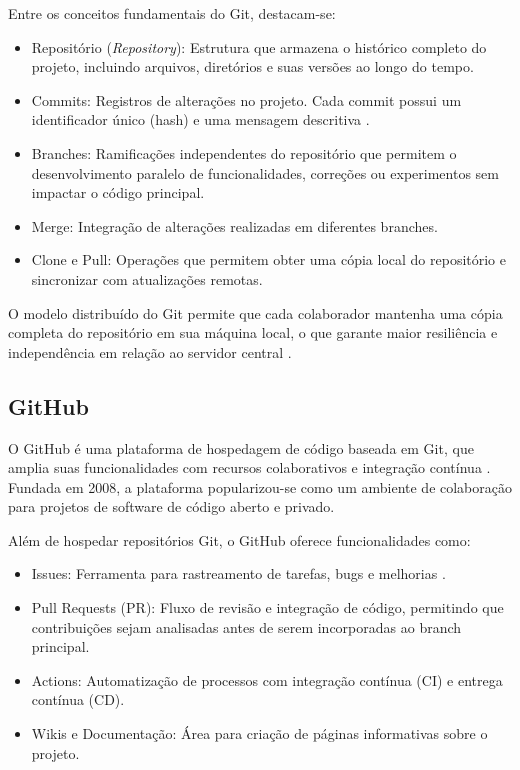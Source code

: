 Entre os conceitos fundamentais do Git, destacam-se:

\begin{itemize}
\item Repositório (\textit{Repository}): Estrutura que armazena o histórico completo do projeto, incluindo arquivos, diretórios e suas versões ao longo do tempo.
\item Commits: Registros de alterações no projeto. Cada commit possui um identificador único (hash) e uma mensagem descritiva \cite{chacon_git}.
\item Branches: Ramificações independentes do repositório que permitem o desenvolvimento paralelo de funcionalidades, correções ou experimentos sem impactar o código principal.
\item Merge: Integração de alterações realizadas em diferentes branches.
\item Clone e Pull: Operações que permitem obter uma cópia local do repositório e sincronizar com atualizações remotas.
\end{itemize}

O modelo distribuído do Git permite que cada colaborador mantenha uma cópia completa do repositório em sua máquina local, o que garante maior resiliência e independência em relação ao servidor central \cite{chacon_git}.

\subsection{GitHub}
\label{subsec:github}

O GitHub é uma plataforma de hospedagem de código baseada em Git, que amplia suas funcionalidades com recursos colaborativos e integração contínua \cite{github_official}. Fundada em 2008, a plataforma popularizou-se como um ambiente de colaboração para projetos de software de código aberto e privado.

Além de hospedar repositórios Git, o GitHub oferece funcionalidades como:
\begin{itemize}
\item Issues: Ferramenta para rastreamento de tarefas, bugs e melhorias \cite{github_official}.
\item Pull Requests (PR): Fluxo de revisão e integração de código, permitindo que contribuições sejam analisadas antes de serem incorporadas ao branch principal.
\item Actions: Automatização de processos com integração contínua (CI) e entrega contínua (CD).
\item Wikis e Documentação: Área para criação de páginas informativas sobre o projeto.
\end{itemize}

